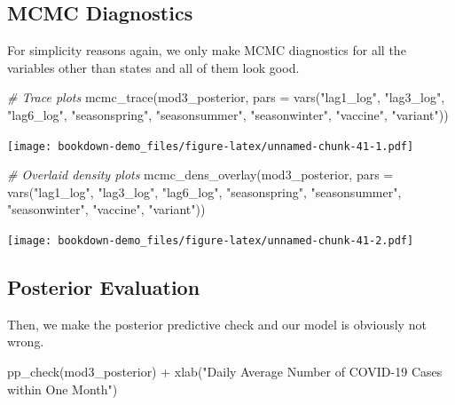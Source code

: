 \documentclass[
]{book}
\newenvironment{Shaded}{\begin{snugshade}}{\end{snugshade}}
\newcommand{\AttributeTok}[1]{\textcolor[rgb]{0.77,0.63,0.00}{#1}}
\newcommand{\CommentTok}[1]{\textcolor[rgb]{0.56,0.35,0.01}{\textit{#1}}}
\newcommand{\FunctionTok}[1]{\textcolor[rgb]{0.00,0.00,0.00}{#1}}
\newcommand{\NormalTok}[1]{#1}
\newcommand{\SpecialCharTok}[1]{\textcolor[rgb]{0.00,0.00,0.00}{#1}}
\newcommand{\StringTok}[1]{\textcolor[rgb]{0.31,0.60,0.02}{#1}}
\begin{document}
\hypertarget{mcmc-diagnostics-2}{%
\subsection{MCMC Diagnostics}\label{mcmc-diagnostics-2}}

For simplicity reasons again, we only make MCMC diagnostics for all the variables other than states and all of them look good.

\begin{Shaded}
\begin{Highlighting}[]
\CommentTok{\# Trace plots}
\FunctionTok{mcmc\_trace}\NormalTok{(mod3\_posterior, }\AttributeTok{pars =} \FunctionTok{vars}\NormalTok{(}\StringTok{"lag1\_log"}\NormalTok{, }\StringTok{"lag3\_log"}\NormalTok{, }\StringTok{"lag6\_log"}\NormalTok{, }\StringTok{"seasonspring"}\NormalTok{, }\StringTok{"seasonsummer"}\NormalTok{, }\StringTok{"seasonwinter"}\NormalTok{, }\StringTok{"vaccine"}\NormalTok{, }\StringTok{"variant"}\NormalTok{))}
\end{Highlighting}
\end{Shaded}

\texttt{[image: bookdown-demo\_files/figure-latex/unnamed-chunk-41-1.pdf]}

\begin{Shaded}
\begin{Highlighting}[]
\CommentTok{\# Overlaid density plots}
\FunctionTok{mcmc\_dens\_overlay}\NormalTok{(mod3\_posterior, }\AttributeTok{pars =} \FunctionTok{vars}\NormalTok{(}\StringTok{"lag1\_log"}\NormalTok{, }\StringTok{"lag3\_log"}\NormalTok{, }\StringTok{"lag6\_log"}\NormalTok{, }\StringTok{"seasonspring"}\NormalTok{, }\StringTok{"seasonsummer"}\NormalTok{, }\StringTok{"seasonwinter"}\NormalTok{, }\StringTok{"vaccine"}\NormalTok{, }\StringTok{"variant"}\NormalTok{)) }
\end{Highlighting}
\end{Shaded}

\texttt{[image: bookdown-demo\_files/figure-latex/unnamed-chunk-41-2.pdf]}

\hypertarget{posterior-evaluation-2}{%
\subsection{Posterior Evaluation}\label{posterior-evaluation-2}}

Then, we make the posterior predictive check and our model is obviously not wrong.

\begin{Shaded}
\begin{Highlighting}[]
\FunctionTok{pp\_check}\NormalTok{(mod3\_posterior) }\SpecialCharTok{+} 
    \FunctionTok{xlab}\NormalTok{(}\StringTok{"Daily Average Number of COVID{-}19 Cases within One Month"}\NormalTok{)}
\end{Highlighting}
\end{Shaded}
\end{document}
